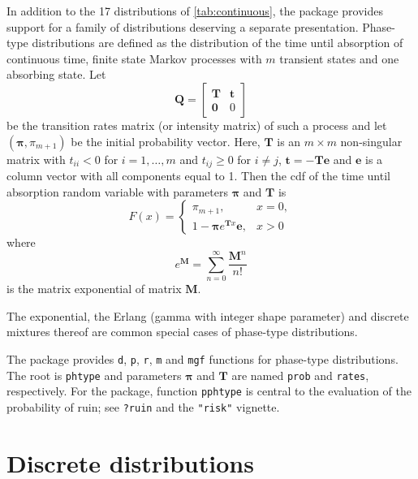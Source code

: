 \documentclass[x11names]{article}
\newcommand{\mat}[1]{\bm{#1}}
\newcommand{\code}[1]{\texttt{#1}}
\begin{document}
In addition to the 17 distributions of \autoref{tab:continuous},
the package provides support for a family of distributions deserving a
separate presentation. Phase-type distributions \citep{Neuts_81} are
defined as the distribution of the time until absorption of continuous
time, finite state Markov processes with $m$ transient states and one
absorbing state. Let
\begin{equation}
  \label{eq:Markov-transition-matrix}
  \mat{Q} =
  \begin{bmatrix}
    \mat{T} & \mat{t} \\
    \mat{0} & 0
  \end{bmatrix}
\end{equation}
be the transition rates matrix (or intensity matrix) of such a process
and let $(\pmb{\pi}, \pi_{m + 1})$ be the initial probability vector.
Here, $\mat{T}$ is an $m \times m$ non-singular matrix with $t_{ii} <
0$ for $i = 1, \dots, m$ and $t_{ij} \geq 0$ for $i \neq j$, $\mat{t}
= - \mat{T} \mat{e}$ and $\mat{e}$ is a column vector with all
components equal to 1. Then the cdf of the time until absorption
random variable with parameters $\pmb{\pi}$ and $\mat{T}$ is
\begin{equation}
  \label{eq:cdf-phtype}
  F(x) =
  \begin{cases}
    \pi_{m + 1}, & x = 0, \\
    1 - \pmb{\pi} e^{\mat{T} x} \mat{e}, & x > 0
  \end{cases}
\end{equation}
where
\begin{equation}
  \label{eq:matrix-exponential}
  e^{\mat{M}} = \sum_{n = 0}^\infty \frac{\mat{M}^n}{n!}
\end{equation}
is the matrix exponential of matrix $\mat{M}$.

The exponential, the Erlang (gamma with integer shape parameter) and
discrete mixtures thereof are common special cases of phase-type
distributions.

The package provides \code{d}, \code{p}, \code{r}, \code{m} and
\code{mgf} functions for phase-type distributions. The root is
\code{phtype} and parameters $\mat{\pi}$ and $\mat{T}$ are named
\code{prob} and \code{rates}, respectively. For the package, function
\code{pphtype} is central to the evaluation of the probability of
ruin; see \code{?ruin} and the \code{"risk"} vignette.


\section{Discrete distributions}
\label{sec:discrete}
\end{document}
